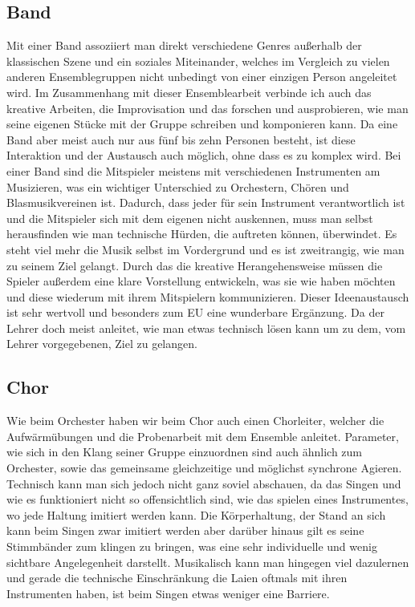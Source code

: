 \subsection{Band}
Mit einer Band assoziiert man direkt verschiedene Genres außerhalb der
klassischen Szene und ein soziales Miteinander, welches im Vergleich zu vielen
anderen Ensemblegruppen nicht unbedingt von einer einzigen Person angeleitet wird. 
Im Zusammenhang mit dieser Ensemblearbeit verbinde ich auch das kreative
Arbeiten, die Improvisation und das forschen und ausprobieren, wie man seine
eigenen Stücke mit der Gruppe schreiben und komponieren kann. Da eine Band aber
meist auch nur aus fünf bis zehn Personen besteht, ist diese Interaktion und der
Austausch auch möglich, ohne dass es zu komplex wird.
Bei einer Band sind die Mitspieler meistens mit verschiedenen Instrumenten am
Musizieren, was ein wichtiger Unterschied zu Orchestern, Chören und
Blasmusikvereinen ist. Dadurch, dass jeder für sein Instrument verantwortlich
ist und die Mitspieler sich mit dem eigenen nicht auskennen, muss man selbst
herausfinden wie man technische Hürden, die auftreten können, überwindet. Es
steht viel mehr die Musik selbst im Vordergrund und es ist zweitrangig, wie man
zu seinem Ziel gelangt. Durch das die kreative Herangehensweise müssen die
Spieler außerdem eine klare Vorstellung entwickeln, was sie wie haben möchten
und diese wiederum mit ihrem Mitspielern kommunizieren. Dieser Ideenaustausch
ist sehr wertvoll und besonders zum EU eine wunderbare Ergänzung. Da der Lehrer doch meist anleitet, wie
man etwas technisch lösen kann um zu dem, vom Lehrer vorgegebenen, Ziel zu
gelangen. 


\subsection{Chor}
Wie beim Orchester haben wir beim Chor auch einen Chorleiter, welcher die
Aufwärmübungen und die Probenarbeit mit dem Ensemble anleitet. Parameter, wie
sich in den Klang seiner Gruppe einzuordnen sind auch ähnlich zum Orchester,
sowie das gemeinsame gleichzeitige und möglichst synchrone Agieren. Technisch
kann man sich jedoch nicht ganz soviel abschauen, da das Singen und wie es
funktioniert nicht so offensichtlich sind, wie das spielen eines Instrumentes,
wo jede Haltung imitiert werden kann. Die Körperhaltung, der Stand an sich kann
beim Singen zwar imitiert werden aber darüber hinaus gilt es seine Stimmbänder zum
klingen zu bringen, was eine sehr individuelle und wenig sichtbare Angelegenheit
darstellt. Musikalisch kann man hingegen viel dazulernen und gerade die
technische Einschränkung die Laien oftmals mit ihren Instrumenten haben, ist
beim Singen etwas weniger eine Barriere.


